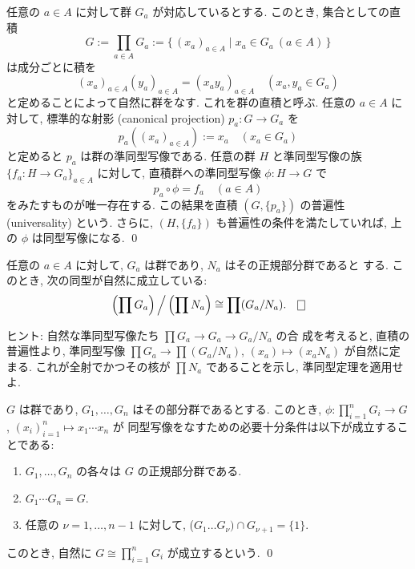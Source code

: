 \documentclass[12pt,twoside]{jarticle}
\def\isom{\cong}
\begin{document}
\begin{question}[群の直積]
  任意の $a\in A$ に対して群 $G_a$ が対応しているとする.
  このとき, 集合としての直積
  \begin{equation*}
    G := \prod_{a\in A} G_a
    := \{\, (x_a)_{a\in A} \mid x_a\in G_a \ (a\in A)\,\}
  \end{equation*}
  は成分ごとに積を
  \begin{equation*}
    (x_a)_{a\in A} (y_a)_{a\in A} = (x_a y_a)_{a\in A}
    \quad (x_a,y_a\in G_a)
  \end{equation*}
  と定めることによって自然に群をなす. これを群の直積と呼ぶ.
  任意の $a\in A$ に対して, 
  標準的な射影 (canonical projection) $p_a : G \to G_a$ を
  \begin{equation*}
    p_a\left( (x_a)_{a\in A} \right) := x_a
    \quad (x_a\in G_a)
  \end{equation*}
  と定めると $p_a$ は群の準同型写像である.
  任意の群 $H$ と準同型写像の族 $\{f_a:H\to G_a\}_{a\in A}$ に対して, 
  直積群への準同型写像 $\phi:H\to G$ で
  \begin{equation*}
    p_a\circ\phi = f_a
    \quad (a\in A)
  \end{equation*}
  をみたすものが唯一存在する. 
  この結果を直積 $(G, \{p_a\})$ の普遍性 (universality) という.
  さらに, $(H, \{f_a\})$ も普遍性の条件を満たしていれば,
  上の $\phi$ は同型写像になる.
  \qed
\end{question}

\begin{question}[剰余群を取る操作と直積の可換性]
  任意の $a\in A$ に対して, $G_a$ は群であり, $N_a$ はその正規部分群であると
  する. このとき, 次の同型が自然に成立している:
  \begin{equation*}
    \left(\prod G_a\right)\Big/ \left(\prod N_a \right) \isom \prod (G_a/N_a).
    \qed
  \end{equation*}
\end{question}

\noindent ヒント: 自然な準同型写像たち $\prod G_a \to G_a \to G_a/N_a$ の合
成を考えると, 直積の普遍性より, 準同型写像 $\prod G_a \to \prod (G_a/N_a)$, 
$(x_a)\mapsto(x_aN_a)$ が自然に定まる. 
これが全射でかつその核が $\prod N_a$ であることを示し, 準同型定理を適用せよ.

\begin{question}[直積の判定法]
  $G$ は群であり, $G_1,\dots,G_n$ はその部分群であるとする. このとき,
  $\phi: \prod_{i=1}^n G_i \to G$, $(x_i)_{i=1}^n\mapsto x_1\cdots x_n$ が
  同型写像をなすための必要十分条件は以下が成立することである:
  \begin{enumerate}
  \item $G_1,\dots,G_n$ の各々は $G$ の正規部分群である.
  \item $G_1\cdots G_n = G$.
  \item 任意の $\nu=1,\dots,n-1$ に対して,
    ($G_1\dots G_\nu)\cap G_{\nu+1} = \{1\}$.
  \end{enumerate}
  このとき, 自然に $G\isom \prod_{i=1}^n G_i$ が成立するという.
  \qed
\end{question}
\end{document}
